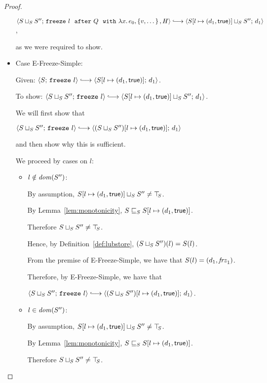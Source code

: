\begin{proof}
\begin{itemize}
      $\config{\lubstore{S}{S''}}{\freezeafterfull{l}{Q}{\lam{x}{e_0}}{\setof{v,
            \dots}}{H}} \parstepsto
      \config{\lubstore{\extS{S}{l}{d_1}{\frozentrue}}{S''}}{d_1}$,

      as we were required to show.

    \item Case {\sc E-Freeze-Simple}:

      Given: $\config{S}{\freeze{l}} \parstepsto
      \config{\extS{S}{l}{d_1}{\frozentrue}}{d_1}$.

      To show: $\config{\lubstore{S}{S''}}{\freeze{l}}
      \parstepsto
      \config{\lubstore{\extS{S}{l}{d_1}{\frozentrue}}{S''}}{d_1}$.

      We will first show that

      $\config{\lubstore{S}{S''}}{\freeze{l}} \parstepsto
      \config{\extS{(\lubstore{S}{S''})}{l}{d_1}{\frozentrue}}{d_1}$

      and then show why this is sufficient.

      We proceed by cases on $l$:
      \begin{itemize}
      \item $l \notin \mathit{dom}(S'')$:

        By assumption, $S[l \mapsto (d_1, \textsf{true})] \sqcup_{S} S''
        \neq \top\hspace{-0.85mm}_{S}$.

        By Lemma~\ref{lem:monotonicity},
        $S \sqsubseteq_S S[l \mapsto (d_1, \textsf{true})]$.

        Therefore $S \sqcup_{S} S'' \neq \top\hspace{-0.85mm}_{S}$.

        Hence, by Definition~\ref{def:lubstore},
        $(S \sqcup_{S} S'')(l) = S(l)$.

        From the premise of {\sc E-Freeze-Simple}, we have that
        $S(l) = (d_1, \mathit{frz}_1)$.

        Therefore, by {\sc E-Freeze-Simple}, we have that

        $\config{\lubstore{S}{S''}}{\freeze{l}}
        \parstepsto
        \config{\extS{(\lubstore{S}{S''})}{l}{d_1}{\frozentrue}}{d_1}$.

      \item $l \in \mathit{dom}(S'')$:

        By assumption, $S[l \mapsto (d_1, \textsf{true})] \sqcup_{S} S''
        \neq \top\hspace{-0.85mm}_{S}$.

        By Lemma~\ref{lem:monotonicity},
        $S \sqsubseteq_S S[l \mapsto (d_1, \textsf{true})]$.

        Therefore $S \sqcup_{S} S'' \neq \top\hspace{-0.85mm}_{S}$.


\end{itemize}
\end{itemize}
\end{proof}
